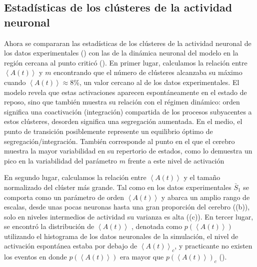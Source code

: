 \subsection{Estadísticas de los clústeres de la actividad neuronal }\label{eq:estadistica_clusteres_modelo}



Ahora se compararan  las estadísticas de los clústeres de la actividad neuronal  de los  datos experimentales ()  con las de la   dinámica neuronal del modelo en la región cercana al  punto criticó ().   En primer lugar,  calculamos la relación entre $\left\langle A(t) \right\rangle$ y $m$ encontrando  que el número de clústeres alcanzaba su máximo cuando $ \left\langle A(t) \right\rangle \approx 8\%$,  un valor cercano al de los datos experimentales. El modelo revela que estas activaciones aparecen espontáneamente en el estado de reposo, sino que también muestra su relación con el régimen dinámico: orden significa una coactivación (integración) compartida de los procesos subyacentes a estos clústeres, desorden significa una segregación aumentada. En el medio, el punto de transición posiblemente represente un equilibrio óptimo de segregación/integración. También corresponde al punto en el que el cerebro muestra la mayor variabilidad en su repertorio de estados, como lo demuestra un pico en la variabilidad del parámetro $m$  frente  a este nivel de activación


En segundo lugar, calculamos la relación entre $\left\langle A(t) \right\rangle$ y el tamaño normalizado del clúster más grande.  Tal como en los datos experimentales $\bar{S}_1$  se comporta como un parámetro de orden $\left\langle A(t) \right\rangle$  y abarca un amplio rango de escalas, desde unas pocas neuronas hasta una gran proporción del cerebro ((b)), solo en niveles intermedios de actividad su varianza es alta ((c)). En tercer lugar, se encontró  la distribución de $\left\langle A(t) \right\rangle$ , denotada como $p(\left\langle A(t) \right\rangle)$ utilizando el histograma de los datos neuronales de la simulación, el nivel de activación espontánea estaba por debajo de $\left\langle A(t) \right\rangle_c$, y practicante no existen los eventos en donde  $p(\left\langle A(t) \right\rangle)$ era mayor que  $p(\left\langle A(t) \right\rangle)_c$ (). 


